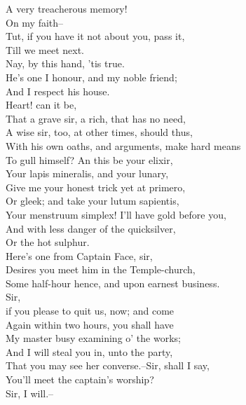 \documentclass{memoir}
\begin{document}
\begin{drama*}
\surlyspeaks  A very treacherous memory!\\
\mammonspeaks {} On my faith--\\
\surlyspeaks  Tut, if you have it not about you, pass it,\\
 Till we meet next.\\
\mammonspeaks {} Nay, by this hand, 'tis true.\\
 He's one I honour, and my noble friend;\\
 And I respect his house.\\
\surlyspeaks {} Heart! can it be,\\
 That a grave sir, a rich, that has no need,\\
 A wise sir, too, at other times, should thus,\\
 With his own oaths, and arguments, make hard means\\
 To gull himself? An this be your elixir,\\
 Your lapis mineralis, and your lunary,\\
 Give me your honest trick yet at primero,\\
 Or gleek; and take your lutum sapientis,\\
 Your menstruum simplex! I'll have gold before you,\\
 And with less danger of the quicksilver,\\
 Or the hot sulphur.\\
\facespeaks {} Here's one from Captain Face, sir,\\
 Desires you meet him in the Temple-church,\\
 Some half-hour hence, and upon earnest business.\\
 Sir,\\
 if you please to quit us, now; and come\\
 Again within two hours, you shall have\\
 My master busy examining o' the works;\\
 And I will steal you in, unto the party,\\
 That you may see her converse.--Sir, shall I say,\\
 You'll meet the captain's worship?\\
\surlyspeaks {} Sir, I will.--\\

\end{drama*}
\end{document}

